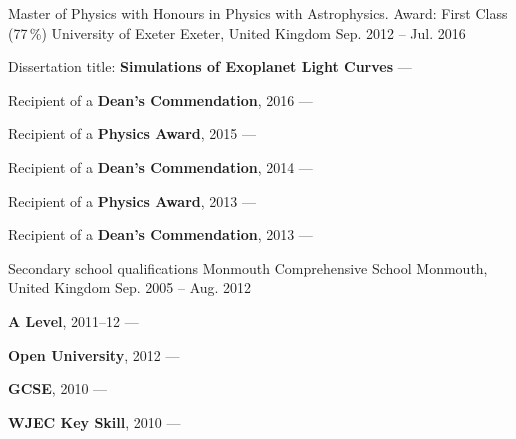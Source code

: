\begin{cventries}
    \cventry
        {Master of Physics with Honours in Physics with Astrophysics. Award: First Class (77\,\%)} %
        {University of Exeter} %
        {Exeter, United Kingdom} %
        {Sep. 2012 -- Jul. 2016} %
        {
        \begin{cvitems} %
            \item {Dissertation title: \textbf{Simulations of Exoplanet Light Curves} --- }
            \vspace{0.5mm}
            \item {Recipient of a \textbf{Dean's Commendation}, 2016 --- }
            \vspace{0.5mm}
            \item {Recipient of a \textbf{Physics Award}, 2015 --- }
            \vspace{0.5mm}
            \item {Recipient of a \textbf{Dean's Commendation}, 2014 --- }
            \vspace{0.5mm}
            \item {Recipient of a \textbf{Physics Award}, 2013 --- }
            \vspace{0.5mm}
            \item {Recipient of a \textbf{Dean's Commendation}, 2013 --- }
        \end{cvitems}
        }

    \cventry
        {Secondary school qualifications}
        {Monmouth Comprehensive School}
        {Monmouth, United Kingdom}
        {Sep. 2005 -- Aug. 2012}
        {
        \begin{cvitems}
            \item {\textbf{A Level}, 2011--12 --- }
            \vspace{0.5mm}
            \item {\textbf{Open University}, 2012 --- }
            \vspace{0.5mm}
            \item {\textbf{GCSE}, 2010 --- }
            \vspace{0.5mm}
            \item {\textbf{WJEC Key Skill}, 2010 --- }
        \end{cvitems}
        }
\end{cventries}

